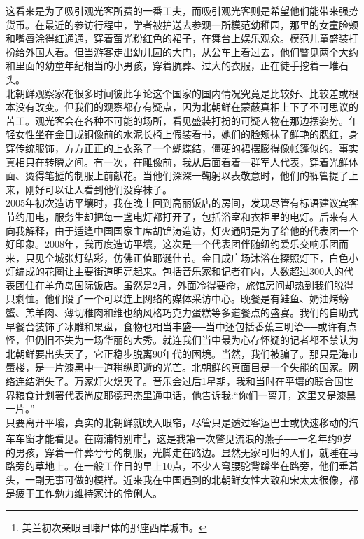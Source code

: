 这看来是为了吸引观光客所费的一番工夫，而吸引观光客则是希望他们能带来强势货币。在最近的参访行程中，学者被护送去参观一所模范幼稚园，那里的女童脸颊和嘴唇涂得红通通，穿着萤光粉红色的裙子，在舞台上娱乐观众。模范儿童盛装打扮给外国人看。但当游客走出幼儿园的大门，从公车上看过去，他们瞥见两个大约和里面的幼童年纪相当的小男孩，穿着肮葬、过大的衣服，正在徒手挖着一堆石头。\\

北朝鲜观察家花很多时间彼此争论这个国家的国内情况究竟是比较好、比较差或根本没有改变。但我们的观察都存有疑点，因为北朝鲜在蒙蔽真相上下了不可思议的苦工。观光客会在各种不可能的场所，看见盛装打扮的可疑人物在那边摆姿势。年轻女性坐在金日成铜像前的水泥长椅上假装看书，她们的脸颊抹了鲜艳的腮红，身穿传统服饰，方方正正的上衣系了一个蝴蝶结，僵硬的裙摆膨得像帐篷似的。事实真相只在转瞬之间。有一次，在雕像前，我从后面看着一群军人代表，穿着光鲜体面、烫得笔挺的制服上前献花。当他们深深一鞠躬以表敬意时，他们的裤管提了上来，刚好可以让人看到他们没穿袜子。\\

2005年初次造访平壤时，我在晚上回到高丽饭店的房间，发现尽管有标语建议宾客节约用电，服务生却把每一盏电灯都打开了，包括浴室和衣柜里的电灯。后来有人向我解释，由于适逢中国国家主席胡锦涛造访，灯火通明是为了给他的代表团一个好印象。2008年，我再度造访平壤，这次是一个代表团伴随纽约爱乐交响乐团而来，只见全城张灯结彩，仿佛正值耶诞佳节。金日成广场沐浴在探照灯下，白色小灯编成的花圈让主要街道明亮起来。包括音乐家和记者在内，人数超过300人的代表团住在羊角岛国际饭店。虽然是2月，外面冷得要命，旅馆房间却热到我们脱得只剩恤。他们设了一个可以连上网络的媒体采访中心。晚餐是有鲑鱼、奶油烤螃蟹、羔羊肉、薄切稚肉和维也纳风格巧克力蛋糕等多道餐点的盛宴。我们的自助式早餐台装饰了冰雕和果盘，食物也相当丰盛──当中还包括香蕉三明治──或许有点怪，但仍旧不失为一场华丽的大秀。就连我们当中最为心存怀疑的记者都不禁认为北朝鲜要出头天了，它正稳步脱离90年代的困境。当然，我们被骗了。那只是海市蜃楼，是一片漆黑中一道稍纵即逝的光芒。北朝鲜的真面目是一个失能的国家。网络连结消失了。万家灯火熄灭了。音乐会过后1星期，我和当时在平壤的联合国世界粮食计划署代表尚皮耶德玛杰里通电话，他告诉我:“你们一离开，这里又是漆黑一片。”\\

只要离开平壤，真实的北朝鲜就映入眼帘，尽管只是透过客运巴士或快速移动的汽车车窗才能看见。在南浦特别市\footnote{美兰初次亲眼目睹尸体的那座西岸城市。}，这是我第一次瞥见流浪的燕子──一名年约9岁的男孩，穿着一件葬兮兮的制服，光脚走在路边。显然无家可归的人们，就睡在马路旁的草地上。在一般工作日的早上10点，不少人弯腰驼背蹲坐在路旁，他们垂着头，一副无事可做的模样。近来我在中国遇到的北朝鲜女性大致和宋太太很像，都是疲于工作勉力维持家计的伶俐人。\\

